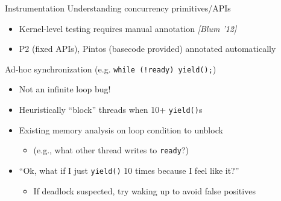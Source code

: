 \documentclass[xcolor=dvipsnames]{beamer}
\begin{document}
\begin{frame}{Instrumentation}
	Understanding concurrency primitives/APIs
	\begin{itemize}
		\item Kernel-level testing requires manual annotation {\em [Blum '12]}
		\item P2 (fixed APIs), Pintos (basecode provided) annotated automatically
	\end{itemize}
	\pause
	\linegap

	Ad-hoc synchronization (e.g. {\tt while (!ready) yield();})
	\begin{itemize}
		\item Not an infinite loop bug!
		\item Heuristically ``block'' threads when 10+ {\tt yield()}s %
		\item Existing memory analysis %
			on loop condition to unblock
			\begin{itemize}
				\item (e.g., what other thread writes to {\tt ready}?)
			\end{itemize}
			\pause
		\item ``Ok, what if I just {\tt yield()} 10 times because I feel like it?''
			\begin{itemize}
				\item If deadlock suspected, try waking up to avoid false positives
			\end{itemize}
	\end{itemize}



\end{frame}

\end{document}
